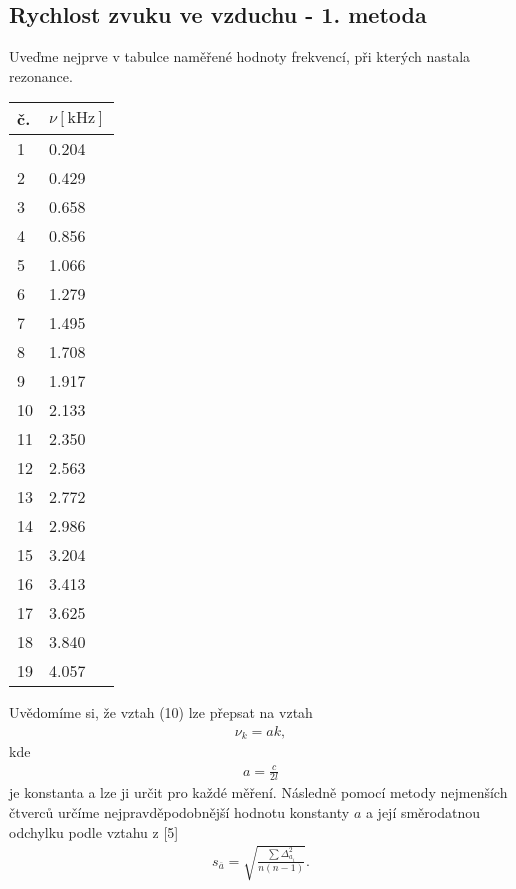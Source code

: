 \subsection{Rychlost zvuku ve vzduchu - 1. metoda}
\par Uveďme nejprve v tabulce naměřené hodnoty frekvencí, při kterých nastala rezonance.
\begin{center}
     \label{tab:title} 
    \begin{tabular}{| l | l |}
    \hline
     č. & $\nu [\mathrm{kHz}]$   \\ \hline
     \hline
    1  & 0.204  \\ \hline
    2  & 0.429 \\ \hline
    3 & 0.658 \\ \hline
    4&0.856 \\ \hline
    5 &1.066\\ \hline
    6&1.279\\ \hline
    7&1.495\\ \hline
    8&1.708\\ \hline
    9&1.917\\ \hline
    10&2.133\\ \hline
    11&2.350\\ \hline
    12&2.563\\ \hline
    13 &2.772\\ \hline
    14&2.986\\ \hline
    15&3.204\\ \hline
    16&3.413\\ \hline
    17&3.625\\ \hline
    18&3.840\\ \hline
    19&4.057\\ \hline
    \end{tabular}
\end{center}
Uvědomíme si, že vztah (10) lze přepsat na vztah
\begin{align}
    \nu_k = ak,
\end{align}
kde
\begin{align}
 a = \frac{c}{2l}    
\end{align}
je konstanta a lze ji určit pro každé měření. Následně pomocí metody nejmenších čtverců určíme nejpravděpodobnější hodnotu konstanty $a$ a její směrodatnou odchylku podle vztahu z [5]
\begin{align}
    s_{\overline{a}} = \sqrt{\frac{\sum \Delta^2_{a_i}}{n (n-1)}}.
\end{align}

